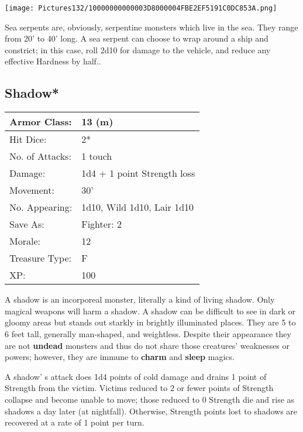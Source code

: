 \documentclass[a4paper,twoside,openany,10pt]{book}
\begin{document}
\begin{multicols}{2}
\begin{center} \texttt{[image: Pictures132/10000000000003D8000004FBE2EF5191C0DC853A.png]} \end{center}

Sea serpents are, obviously, serpentine monsters which live in the sea. They range from 20' to 40' long. A sea serpent can choose to wrap around a ship and constrict; in this case, roll 2d10 for damage to the vehicle, and reduce any effective Hardness by half..


\subsection*{Shadow*}\label{shadow}

\begin{tabularx}{0.50\textwidth}{@{}lX@{}}
Armor Class: & 13 (m) \\\hline
Hit Dice: & 2* \\\hline
No. of Attacks: & 1 touch \\\hline
Damage: & 1d4 + 1 point Strength loss \\\hline
Movement: & 30' \\\hline
No. Appearing: & 1d10, Wild 1d10, Lair 1d10 \\\hline
Save As: & Fighter: 2 \\\hline
Morale: & 12 \\\hline
Treasure Type: & F \\\hline
XP: & 100 \\\hline
\end{tabularx}\medskip

A shadow is an incorporeal monster, literally a kind of living shadow. Only magical weapons will harm a shadow. A shadow can be difficult to see in dark or gloomy areas but stands out starkly in brightly illuminated places. They are 5 to 6 feet tall, generally man-shaped, and weightless. Despite their appearance they are not \textbf{undead} monsters and thus do not share those creatures' weaknesses or powers; however, they are immune to \textbf{charm }and \textbf{sleep }magics.

A shadow' s attack does 1d4 points of cold damage and drains 1 point of Strength from the victim. Victims reduced to 2 or fewer points of Strength collapse and become unable to move; those reduced to 0 Strength die and rise as shadows a day later (at nightfall). Otherwise, Strength points lost to shadows are recovered at a rate of 1 point per turn.


\end{multicols}
\end{document}
